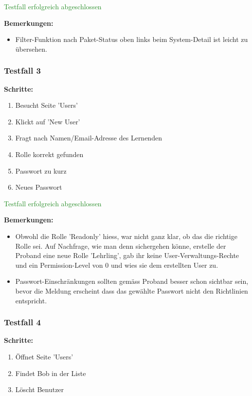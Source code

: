 \textcolor{ForestGreen}{Testfall erfolgreich abgeschlossen}

\bigskip
\textbf{Bemerkungen:}

\begin{itemize}[noitemsep,nolistsep]
    \item Filter-Funktion nach Paket-Status oben links beim System-Detail ist leicht zu übersehen.
\end{itemize}


\subsubsection*{Testfall 3}

\textbf{Schritte:}

\begin{enumerate}
    \item Besucht Seite 'Users'
    \item Klickt auf 'New User'
    \item Fragt nach Namen/Email-Adresse des Lernenden
    \item Rolle korrekt gefunden
    \item Passwort zu kurz
    \item Neues Passwort
\end{enumerate}

\textcolor{ForestGreen}{Testfall erfolgreich abgeschlossen}

\bigskip
\textbf{Bemerkungen:}

\begin{itemize}[noitemsep,nolistsep]
    \item Obwohl die Rolle 'Readonly' hiess, war nicht ganz klar, ob das die richtige Rolle sei. Auf Nachfrage, wie man denn sichergehen könne, erstelle der Proband eine neue Rolle 'Lehrling', gab ihr keine User-Verwaltungs-Rechte und ein Permission-Level von 0 und wies sie dem erstellten User zu.
    \item Passwort-Einschränkungen sollten gemäss Proband besser schon sichtbar sein, bevor die Meldung erscheint dass das gewählte Passwort nicht den Richtlinien entspricht.
\end{itemize}


\subsubsection*{Testfall 4}

\textbf{Schritte:}

\begin{enumerate}
    \item Öffnet Seite 'Users'
    \item Findet Bob in der Liste
    \item Löscht Benutzer
\end{enumerate}


